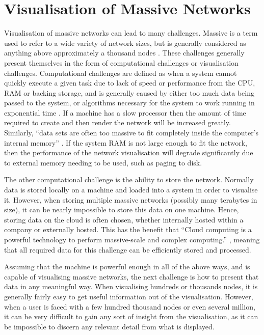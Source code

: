 \documentclass[../dissertation.tex]{subfiles}
\begin{document}
\section{Visualisation of Massive Networks}

Visualisation of massive networks can lead to many challenges. Massive is a term used to refer to a wide variety of network sizes, but is generally considered as anything above approximately a thousand nodes \cite{batagelj1998pajek}. These challenges generally present themselves in the form of computational challenges or visualisation challenges. Computational challenges are defined as when a system cannot quickly execute a given task due to lack of speed or performance from the CPU, RAM or backing storage, and is generally caused by either too much data being passed to the system, or algorithms necessary for the system to work running in exponential time \cite{baker1994approximation}. If a machine has a slow processor then the amount of time required to create and then render the network will be increased greatly. Similarly, ``data sets are often too massive to fit completely inside the computer's internal memory'' \cite{abello2013handbook}. If the system RAM is not large enough to fit the network, then the performance of the network visualisation will degrade significantly due to external memory needing to be used, such as paging to disk. 

The other computational challenge is the ability to store the network. Normally data is stored locally on a machine and loaded into a system in order to visualise it. However, when storing multiple massive networks (possibly many terabytes in size), it can be nearly impossible to store this data on one machine. Hence, storing data on the cloud is often chosen, whether internally hosted within a company or externally hosted. This has the benefit that ``Cloud computing is a powerful technology to perform massive-scale and complex computing.'' \cite{hashem2015rise}, meaning that all required data for this challenge can be efficiently stored and processed.

Assuming that the machine is powerful enough in all of the above ways, and is capable of visualising massive networks, the next challenge is how to present that data in any meaningful way. When visualising hundreds or thousands nodes, it is generally fairly easy to get useful information out of the visualisation. However, when a user is faced with a few hundred thousand nodes or even several million, it can be very difficult to gain any sort of insight from the visualisation, as it can be impossible to discern any relevant detail from what is displayed. 
\end{document}
